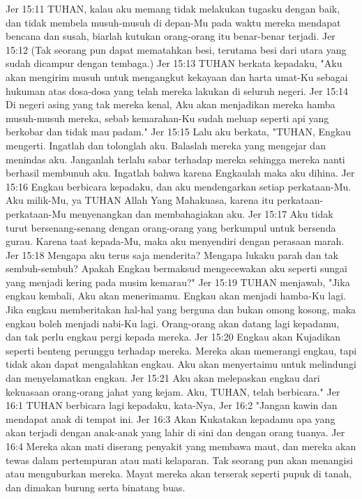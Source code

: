 Jer 15:11  TUHAN, kalau aku memang tidak melakukan tugasku dengan baik, dan tidak membela musuh-musuh di depan-Mu pada waktu mereka mendapat bencana dan susah, biarlah kutukan orang-orang itu benar-benar terjadi.
Jer 15:12  (Tak seorang pun dapat mematahkan besi, terutama besi dari utara yang sudah dicampur dengan tembaga.)
Jer 15:13  TUHAN berkata kepadaku, "Aku akan mengirim musuh untuk mengangkut kekayaan dan harta umat-Ku sebagai hukuman atas dosa-dosa yang telah mereka lakukan di seluruh negeri.
Jer 15:14  Di negeri asing yang tak mereka kenal, Aku akan menjadikan mereka hamba musuh-musuh mereka, sebab kemarahan-Ku sudah meluap seperti api yang berkobar dan tidak mau padam."
Jer 15:15  Lalu aku berkata, "TUHAN, Engkau mengerti. Ingatlah dan tolonglah aku. Balaslah mereka yang mengejar dan menindas aku. Janganlah terlalu sabar terhadap mereka sehingga mereka nanti berhasil membunuh aku. Ingatlah bahwa karena Engkaulah maka aku dihina.
Jer 15:16  Engkau berbicara kepadaku, dan aku mendengarkan setiap perkataan-Mu. Aku milik-Mu, ya TUHAN Allah Yang Mahakuasa, karena itu perkataan-perkataan-Mu menyenangkan dan membahagiakan aku.
Jer 15:17  Aku tidak turut bersenang-senang dengan orang-orang yang berkumpul untuk bersenda gurau. Karena taat kepada-Mu, maka aku menyendiri dengan perasaan marah.
Jer 15:18  Mengapa aku terus saja menderita? Mengapa lukaku parah dan tak sembuh-sembuh? Apakah Engkau bermaksud mengecewakan aku seperti sungai yang menjadi kering pada musim kemarau?"
Jer 15:19  TUHAN menjawab, "Jika engkau kembali, Aku akan menerimamu. Engkau akan menjadi hamba-Ku lagi. Jika engkau memberitakan hal-hal yang berguna dan bukan omong kosong, maka engkau boleh menjadi nabi-Ku lagi. Orang-orang akan datang lagi kepadamu, dan tak perlu engkau pergi kepada mereka.
Jer 15:20  Engkau akan Kujadikan seperti benteng perunggu terhadap mereka. Mereka akan memerangi engkau, tapi tidak akan dapat mengalahkan engkau. Aku akan menyertaimu untuk melindungi dan menyelamatkan engkau.
Jer 15:21  Aku akan melepaskan engkau dari kekuasaan orang-orang jahat yang kejam. Aku, TUHAN, telah berbicara."
Jer 16:1  TUHAN berbicara lagi kepadaku, kata-Nya,
Jer 16:2  "Jangan kawin dan mendapat anak di tempat ini.
Jer 16:3  Akan Kukatakan kepadamu apa yang akan terjadi dengan anak-anak yang lahir di sini dan dengan orang tuanya.
Jer 16:4  Mereka akan mati diserang penyakit yang membawa maut, dan mereka akan tewas dalam pertempuran atau mati kelaparan. Tak seorang pun akan menangisi atau menguburkan mereka. Mayat mereka akan terserak seperti pupuk di tanah, dan dimakan burung serta binatang buas.
